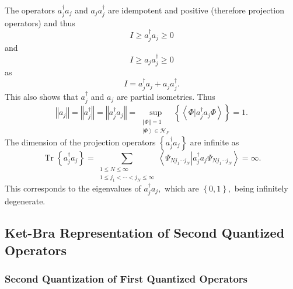 \documentclass[aps,preprint]{revtex4}%
\begin{document}
The operators $a_{j}^{\dagger}a_{j}$ and $a_{j}a_{j}^{\dagger}$ are idempotent
and positive (therefore projection operators) and thus
\begin{equation}
I\geq a_{j}^{\dagger}a_{j}\geq0
\end{equation}
and
\begin{equation}
I\geq a_{j}a_{j}^{\dagger}\geq0
\end{equation}
as
\begin{equation}
I=a_{j}^{\dagger}a_{j}+a_{j}a_{j}^{\dagger}.
\end{equation}
This also shows that $a_{j}^{\dagger}$ and $a_{j}$ are partial isometries.
Thus
\begin{equation}
\left\Vert a_{j}\right\Vert =\left\Vert a_{j}^{\dagger}\right\Vert =\left\Vert
a_{j}^{\dagger}a_{j}\right\Vert =\sup_{\substack{\left\Vert \Phi\right\Vert
=1\\\left\vert \Phi\right\rangle \in\mathcal{H}_{F}}}\left\{  \left\langle
\left.  \Phi\right\vert a_{j}^{\dagger}a_{j}\Phi\right\rangle \right\}  =1.
\label{OccOpNorm}%
\end{equation}
The dimension of the projection operators $\left\{  a_{j}^{\dagger}%
a_{j}\right\}  $ are infinite as
\begin{equation}
\operatorname*{Tr}\left\{  a_{j}^{\dagger}a_{j}\right\}  =\sum
_{\substack{1\leq N\leq\infty\\1\leq j_{1}<\cdots<j_{N}\leq\infty
}}\left\langle \Psi_{Nj_{1}\cdots j_{N}}\left\vert a_{j}^{\dagger}a_{j}%
\Psi_{Nj_{1}\cdots j_{N}}\right.  \right\rangle =\infty.
\end{equation}
This corresponds to the eigenvalues of $a_{j}^{\dagger}a_{j},$ which are
$\left\{  0,1\right\}  ,$ being infinitely degenerate.

\subsection{Ket-Bra Representation of Second Quantized Operators}

\subsubsection{Second Quantization of First Quantized Operators}
\end{document}
